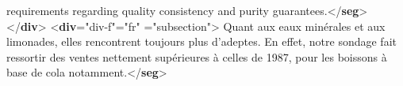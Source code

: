 \begin{shaded}
\hspace*{1em}\hspace*{1em}\hspace*{1em}\hspace*{1em} requirements regarding quality consistency and purity\mbox{}\newline 
\hspace*{1em}\hspace*{1em}\hspace*{1em}\hspace*{1em} guarantees.{</\textbf{seg}>}\mbox{}\newline 
{}\mbox{}\newline 
{</\textbf{div}>}\mbox{}\newline 
{<\textbf{div}\hspace*{1em}{xml:id}="{div-f}"\hspace*{1em}{xml:lang}="{fr}"\mbox{}\newline 
\hspace*{1em}{type}="{subsection}">}\mbox{}\newline 
{}\mbox{}\newline 
\hspace*{1em}Quant aux eaux minérales et aux limonades,\mbox{}\newline 
\hspace*{1em}\hspace*{1em}\hspace*{1em}\hspace*{1em} elles rencontrent toujours plus d'adeptes. En effet, notre\mbox{}\newline 
\hspace*{1em}\hspace*{1em}\hspace*{1em}\hspace*{1em} sondage fait ressortir des ventes nettement\mbox{}\newline 
\hspace*{1em}\hspace*{1em}\hspace*{1em}\hspace*{1em} supérieures à celles de 1987, pour les\mbox{}\newline 
\hspace*{1em}\hspace*{1em}\hspace*{1em}\hspace*{1em} boissons à base de cola notamment.{</\textbf{seg}>}\mbox{}\newline 

\end{shaded}
